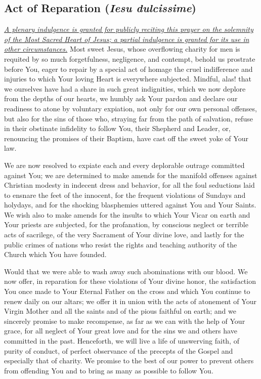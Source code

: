 \documentclass[12pt]{article}
\newcommand{\prayertitle}[1]{\subsection{#1}}
\newcommand{\indulgencedprayertitle}[1]{\prayertitle{#1 \protect\kreuz}}
\newcommand{\foreign}[1]{\textsl{#1}}
\newcommand{\note}[1]{{\small{\textsl{#1}}}\newline}
\newcommand{\linkednote}[2]{\hyperlink{#1}{\note{#2}}}
\begin{document}
\indulgencedprayertitle{Act of Reparation (\foreign{Iesu dulcissime})}
\linkednote{grant3}{A plenary indulgence is granted for publicly reciting this prayer on the solemnity of the Most Sacred Heart of Jesus;
a partial indulgence is granted for its use in other circumstances.}
Most sweet Jesus, whose overflowing charity for men is requited by so much forgetfulness, negligence, and contempt, behold us prostrate before You, eager to repair by a special act of homage the cruel indifference and injuries to which Your loving Heart is everywhere subjected.
Mindful, alas! that we ourselves have had a share in such great indignities, which we now deplore from the depths of our hearts, we humbly ask Your pardon and declare our readiness to atone by voluntary expiation, not only for our own personal offenses, but also for the sins of those who, straying far from the path of salvation, refuse in their obstinate infidelity to follow You, their Shepherd and Leader, or, renouncing the promises of their Baptism, have cast off the sweet yoke of Your law.

We are now resolved to expiate each and every deplorable outrage committed against You; we are determined to make amends for the manifold offenses against Christian modesty in indecent dress and behavior, for all the foul seductions laid to ensnare the feet of the innocent, for the frequent violations of Sundays and holydays, and for the shocking blasphemies uttered against You and Your Saints.
We wish also to make amends for the insults to which Your Vicar on earth and Your priests are subjected, for the profanation, by conscious neglect or terrible acts of sacrilege, of the very Sacrament of Your divine love, and lastly for the public crimes of nations who
resist the rights and teaching authority of the Church which You have founded.

Would that we were able to wash away such abominations with our blood.
We now offer, in reparation for these violations of Your divine honor, the satisfaction You once made to Your Eternal Father on the cross and which You continue to renew daily on our altars;
we offer it in union with the acts of atonement of Your Virgin Mother and all the saints and of the pious faithful on earth;
and we sincerely promise to make recompense, as far as we can with the help of Your grace, for all neglect of Your great love and for the sins we and others have committed in the past.
Henceforth, we will live a life of unswerving faith, of purity of conduct, of perfect observance of the precepts of the Gospel and especially that of charity.
We promise to the best of our power to prevent others from offending You and to bring as many as possible to follow You.
\end{document}
